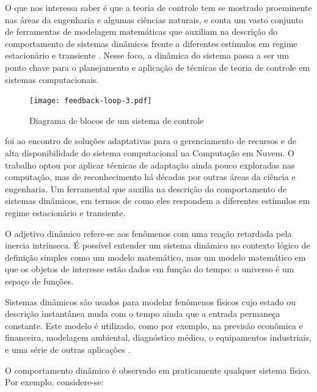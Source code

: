 O que nos interessa saber é que a teoria de controle tem se mostrado proeminente nas áreas da engenharia e algumas ciências naturais, e conta um vasto conjunto de ferramentas de modelagem matemáticas que auxiliam na descrição do comportamento de sistemas dinâmicos frente a diferentes estímulos em regime estacionário e transiente \cite{Nobile2013}. Nesse foco, a dinâmica do sistema passa a ser um ponto chave para o planejamento e aplicação de técnicas de teoria de controle em sistemas computacionais. 

\begin{figure}[htb]	
	\centering
	\texttt{[image: feedback-loop-3.pdf]}
	\caption{Diagrama de blocos de um sistema de controle}
	\label{fig:feedback-nobile}	
\end{figure}

 foi ao encontro de soluções adaptativas para o gerenciamento de recursos e de alta disponibilidade do sistema computacional na Computação em Nuvem. O trabalho optou por aplicar técnicas de adaptação ainda pouco exploradas nas computação, mas de reconhecimento há décadas por outras áreas da ciência e engenharia. Um ferramental que auxilia na descrição do comportamento de sistemas dinâmicos, em termos de como eles respondem a diferentes estímulos em regime estacionário e transiente.

O adjetivo dinâmico refere-se aos fenômenos com uma reação retardada pela inercia intrínseca. É possível entender um sistema dinâmico no contexto lógico de definição simples como um modelo matemático, mas um modelo matemático em que os objetos de interesse estão dados em função do tempo: o universo é um espaço de funções.

Sistemas dinâmicos são usados para modelar fenômenos físicos cujo estado ou descrição instantânea muda com o tempo ainda que a entrada permaneça constante. Este modelo é utilizado, como por exemplo, na previsão econômica e financeira, modelagem ambiental, diagnóstico médico, o equipamentos industriais, e uma série de outras aplicações \cite{Dean1991}.

O comportamento dinâmico é observado em praticamente qualquer sistema físico. Por exemplo, considere-se:

